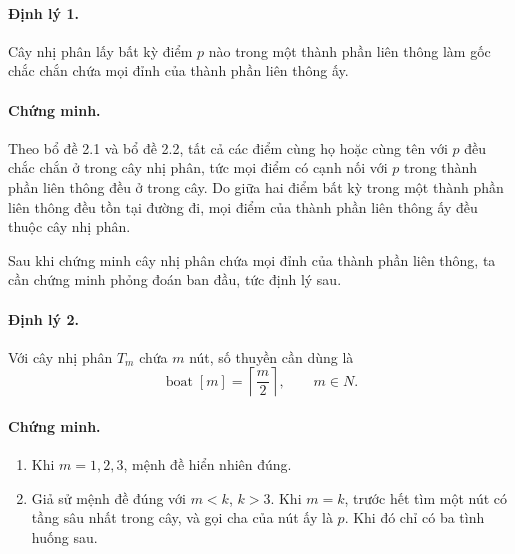 \documentclass[11pt]{article}
\begin{document}
\paragraph{Định lý 1.}
Cây nhị phân lấy bất kỳ điểm \(p\) nào trong một thành phần liên thông làm
gốc chắc chắn chứa mọi đỉnh của thành phần liên thông ấy.

\paragraph{Chứng minh.}
Theo bổ đề 2.1 và bổ đề 2.2, tất cả các điểm cùng họ hoặc cùng tên với \(p\)
đều chắc chắn ở trong cây nhị phân, tức mọi điểm có cạnh nối với \(p\) trong
thành phần liên thông đều ở trong cây. Do giữa hai điểm bất kỳ trong một
thành phần liên thông đều tồn tại đường đi, mọi điểm của thành phần liên
thông ấy đều thuộc cây nhị phân.

Sau khi chứng minh cây nhị phân chứa mọi đỉnh của thành phần liên thông, ta
cần chứng minh phỏng đoán ban đầu, tức định lý sau.

\paragraph{Định lý 2.}
Với cây nhị phân \(T_m\) chứa \(m\) nút, số thuyền cần dùng là
\[
  \operatorname{boat}[m]=\left\lceil\frac{m}{2}\right\rceil,\qquad m\in N.
\]

\paragraph{Chứng minh.}
\begin{enumerate}[label=(\roman*)]
  \item Khi \(m=1,2,3\), mệnh đề hiển nhiên đúng.
  \item Giả sử mệnh đề đúng với \(m<k\), \(k>3\). Khi \(m=k\), trước hết tìm
  một nút có tầng sâu nhất trong cây, và gọi cha của nút ấy là \(p\). Khi đó
  chỉ có ba tình huống sau.
\end{enumerate}
\end{document}
